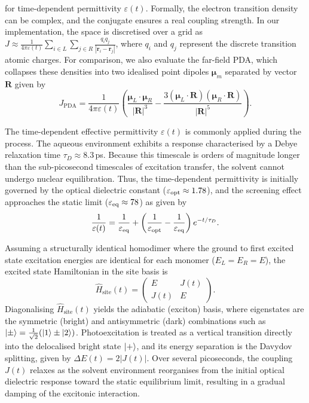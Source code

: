 \documentclass[journal=jpclcd, manuscript=letter, layout=twocolumn, doi=true]{achemso}
\begin{document}
for time-dependent permittivity $\varepsilon(t)$.
Formally, the electron transition density can be complex, and the conjugate ensures a real coupling strength. In our implementation, the space is discretised over a grid as $J \approx\frac{1}{4\pi\varepsilon(t)}\sum_{i\in L}\sum_{j\in R}\frac{q_i q_j}{|\mathbf r_i-\mathbf r_j|}$, where $q_i$ and $q_j$ represent the discrete transition atomic charges. For comparison, we also evaluate the far-field PDA, which collapses these densities into two idealised point dipoles $\boldsymbol{\mu}_m$ separated by vector $\mathbf{R}$ given by
\begin{equation} \label{eq:J_PD}
    J_{\mathrm{PDA}} = \frac{1}{4\pi\varepsilon(t)} \left( \frac{\boldsymbol{\mu}_L \cdot \boldsymbol{\mu}_R}{|\mathbf{R}|^3} - \frac{3(\boldsymbol{\mu}_L \cdot \mathbf{R})(\boldsymbol{\mu}_R \cdot \mathbf{R})}{|\mathbf{R}|^5} \right) .
\end{equation}

The time-dependent effective permittivity $\varepsilon(t)$ is commonly applied during the process. The aqueous environment exhibits a response characterised by a Debye relaxation time $\tau_D \approx 8.3$\,ps. Because this timescale is orders of magnitude longer than the sub-picosecond timescales of excitation transfer, the solvent cannot undergo nuclear equilibration. Thus, the time-dependent permittivity is initially governed by the optical dielectric constant ($\varepsilon_{\rm opt} \approx 1.78$), and the screening effect approaches the static limit ($\varepsilon_{\rm eq} \approx 78$) as given by
\begin{equation}
    \frac{1}{\varepsilon(t)} = \frac{1}{\varepsilon_{\rm eq}} + \left(\frac{1}{\varepsilon_{\rm opt}} - \frac{1}{\varepsilon_{\rm eq}}\right)e^{-t/\tau_D}.
\end{equation}

Assuming a structurally identical homodimer where the ground to first excited state excitation energies are identical for each monomer ($E_L = E_R = E$), the excited state Hamiltonian in the site basis is
\begin{equation}
    \hat H_{\text{site}}(t)=\begin{pmatrix} E & J(t) \\ J(t) & E \end{pmatrix}.
\end{equation}
Diagonalising $\hat H_{\text{site}}(t)$ yields the adiabatic (exciton) basis, where eigenstates are the symmetric (bright) and antisymmetric (dark) combinations such as $\ket{\pm} = \frac{1}{\sqrt{2}}(\ket{1} \pm \ket{2})$. Photoexcitation is treated as a vertical transition directly into the delocalised bright state $\ket{+}$, and its energy separation is the Davydov splitting, given by $\Delta E(t) = 2|J(t)|$. Over several picoseconds, the coupling $J(t)$ relaxes as the solvent environment reorganises from the initial optical dielectric response toward the static equilibrium limit, resulting in a gradual damping of the excitonic interaction.
\end{document}
